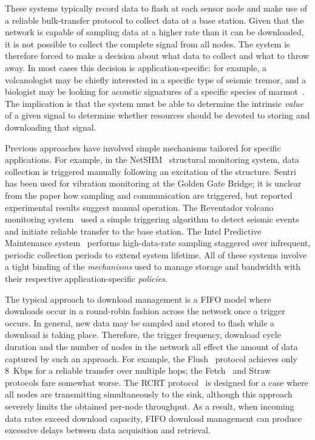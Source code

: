 These systems typically record data to flash at each sensor node 
and make use of a reliable bulk-transfer protocol to collect data at 
a base station. Given that the network is capable of sampling data at
a higher rate than it can be downloaded, it is not possible to 
collect the complete signal from all nodes. 
The system is therefore forced to make
a decision about what data to collect and what to throw away. In most
cases this decision is application-specific: for example, a
volcanologist may be chiefly interested in a specific type of seismic
tremor, and a biologist may be looking for acoustic signatures of a 
specific species of marmot~\cite{girod-ipsn07}. The implication is that
the system must be able to determine the intrinsic {\em value} of
a given signal to determine whether resources should be devoted to 
storing and downloading that signal.

Previous approaches have involved simple mechanisms tailored for 
specific applications. For example, in the
NetSHM~\cite{netshm-spots06,netshm-emnets05} structural monitoring 
system, data collection is 
triggered manually following an excitation of the structure.
Sentri~\cite{ggb-ipsn07} has been used for vibration monitoring at
the Golden Gate Bridge; it is unclear from the paper how sampling and
communication are triggered, but reported experimental results
suggest manual operation. The Reventador volcano monitoring 
system~\cite{volcano-osdi06} used a simple triggering algorithm to detect 
seismic events and initiate reliable transfer to the base station. 
The Intel Predictive Maintenance
system~\cite{intel-northseasensys} performs high-data-rate sampling
staggered over infrequent, periodic collection periods to extend
system lifetime. 
All of these systems involve a tight binding of the {\em mechanisms} 
used to manage storage and bandwidth with their respective 
application-specific {\em policies}.

The typical approach to download management is a FIFO model where downloads
occur in a round-robin fashion across the network once a trigger occurs. In
general, new data may be sampled and stored to flash while a download is
taking place.  Therefore, the trigger frequency, download cycle duration and
the number of nodes in the network all effect the amount of data captured by
such an approach.  For example, the Flush~\cite{flush-sensys07} protocol
achieves only 8~Kbps for a reliable transfer over multiple hops; the
Fetch~\cite{volcano-osdi06} and Straw~\cite{ggb-ipsn07} protocols fare
somewhat worse. The RCRT protocol~\cite{rcrt-sensys07} is designed for a case
where all nodes are transmitting simultaneously to the sink, although this
approach severely limits the obtained per-node throughput. As a result, when
incoming data rates exceed download capacity, FIFO download management can
produce excessive delays between data acquisition and retrieval.

